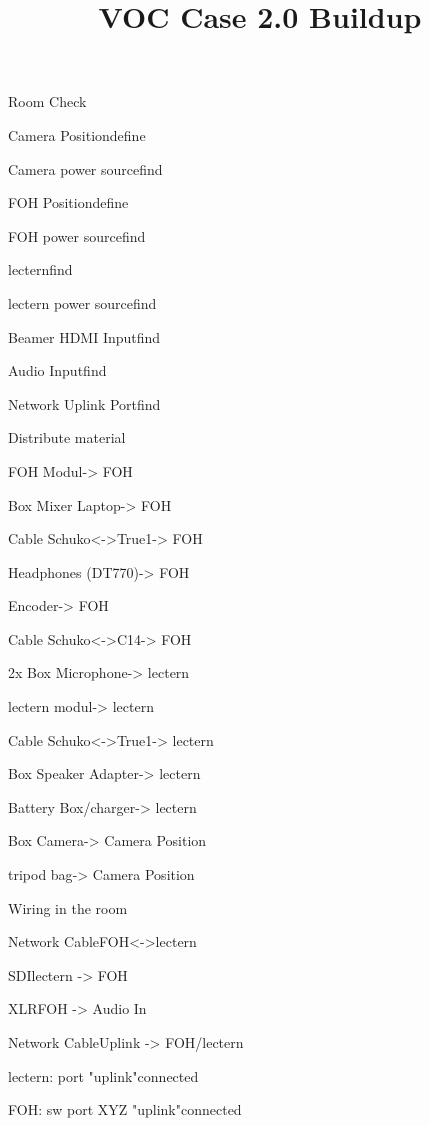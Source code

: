 \def\papersize{4}




\title{VOC Case 2.0 Buildup}

\begin{checklist}{Room Check}
  \item{Camera Position}{define}
  \item{Camera power source}{find}
  \item{FOH Position}{define}
  \item{FOH power source}{find}
  \item{lectern}{find}
  \item{lectern power source}{find}
  \item{Beamer HDMI Input}{find}
  \item{Audio Input}{find}
  \item{Network Uplink Port}{find}
\end{checklist}

\begin{checklist}{Distribute material}
  \item{FOH Modul}{-> FOH}
  \item{Box Mixer Laptop}{-> FOH}
  \item{Cable Schuko<->True1}{-> FOH}
  \item{Headphones (DT770)}{-> FOH}
  \item{Encoder}{-> FOH}
  \item{Cable Schuko<->C14}{-> FOH}
  \item{}{}
  \item{2x Box Microphone}{-> lectern}
  \item{lectern modul}{-> lectern}
  \item{Cable Schuko<->True1}{-> lectern}
  \item{Box Speaker Adapter}{-> lectern}
  \item{Battery Box/charger}{-> lectern}
  \item{Box Camera}{-> Camera Position}
  \item{tripod bag}{-> Camera Position}
\end{checklist}

\begin{checklist}{Wiring in the room}
  \item{Network Cable}{FOH<->lectern}
  \item{SDI}{lectern -> FOH}
  \item{XLR}{FOH -> Audio In}
  \item{Network Cable}{Uplink -> FOH/lectern}
  \item{lectern: port "uplink"}{connected}
  \item{FOH: sw port XYZ "uplink"}{connected}
\end{checklist}

